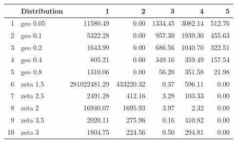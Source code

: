 \begin{table}[ht]
\centering
\begin{tabular}{rlrrrrr}
  \hline
 & Distribution & 1 & 2 & 3 & 4 & 5 \\ 
  \hline
1 & geo 0.05 & 11580.49 & 0.00 & 1334.45 & 3082.14 & 512.76 \\ 
  2 & geo 0.1 & 5322.28 & 0.00 & 957.30 & 1939.30 & 455.63 \\ 
  3 & geo 0.2 & 1643.99 & 0.00 & 686.56 & 1040.70 & 322.51 \\ 
  4 & geo 0.4 & 805.21 & 0.00 & 349.16 & 359.49 & 157.54 \\ 
  5 & geo 0.8 & 1310.06 & 0.00 & 56.20 & 351.58 & 21.98 \\ 
  6 & zeta 1.5 & 281022481.29 & 433220.32 & 0.37 & 596.11 & 0.00 \\ 
  7 & zeta 2.5 & 2491.28 & 412.16 & 3.28 & 103.33 & 0.00 \\ 
  8 & zeta 2 & 16940.07 & 1695.93 & 3.97 & 2.32 & 0.00 \\ 
  9 & zeta 3.5 & 2020.11 & 275.96 & 0.16 & 410.82 & 0.00 \\ 
  10 & zeta 3 & 1804.75 & 224.56 & 0.50 & 294.81 & 0.00 \\ 
   \hline
\end{tabular}
\end{table}
